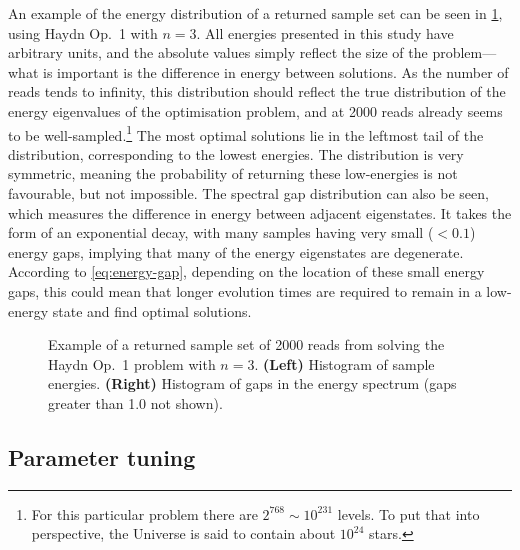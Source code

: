 \documentclass[twocolumn]{article}
\theoremstyle{definition}
\begin{document}
An example of the energy distribution of a returned sample set can be seen in \cref{fig:histograms}, using Haydn Op.\ 1 with $n=3$. All energies presented in this study have arbitrary units, and the absolute values simply reflect the size of the problem---what is important is the difference in energy between solutions. As the number of reads tends to infinity, this distribution should reflect the true distribution of the energy eigenvalues of the optimisation problem, and at \num{2000} reads already seems to be well-sampled.\footnote{For this particular problem there are $2^{768}\sim 10^{231}$ levels. To put that into perspective, the Universe is said to contain about $10^{24}$ stars.} The most optimal solutions lie in the leftmost tail of the distribution, corresponding to the lowest energies. The distribution is very symmetric, meaning the probability of returning these low-energies is not favourable, but not impossible.
The spectral gap distribution can also be seen, which measures the difference in energy between adjacent eigenstates. It takes the form of an exponential decay, with many samples having very small ($<0.1$) energy gaps, implying that many of the energy eigenstates are degenerate. According to \cref{eq:energy-gap}, depending on the location of these small energy gaps, this could mean that longer evolution times are required to remain in a low-energy state and find optimal solutions.

\begin{figure}[t]
    \centering\footnotesize
    
    \caption{Example of a returned sample set of \num{2000} reads from solving the Haydn Op.\ 1 problem with $n=3$. \textbf{(Left)} Histogram of sample energies. \textbf{(Right)} Histogram of gaps in the energy spectrum (gaps greater than \num{1.0} not shown).}
    \label{fig:histograms}
\end{figure}

\subsection*{Parameter tuning}
\end{document}
